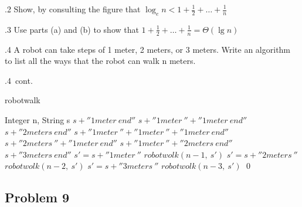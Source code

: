 \documentclass[handout]{beamer}
\begin{document}
        \begin{frame}[c]{\subsecname.2}
            Show, by consulting the figure that $\log_e{n}<1+\frac{1}{2}+\ldots+\frac{1}{n}$
        \end{frame}
    
        \begin{frame}[c]{\subsecname.3}
            Use parts (a) and (b) to show that $1+\frac{1}{2}+\ldots+\frac{1}{n}=\Theta(\lg{n})$
        \end{frame}
    
        \begin{frame}[c]{\subsecname.4}
            A robot can take steps of 1 meter, 2 meters, or 3 meters. Write an algorithm to list all the ways that the robot can walk n meters.
        \end{frame}
        
        \begin{frame}[c,shrink]{\subsecname.4\ cont.}          
            \begin{algorithm}[H]
                \caption {robotwalk}
                \label{alg4}
                \begin{algorithmic}[1]
                    \REQUIRE Integer n, String s
                    \PRINT $s+''1 meter\ end''$
                    \RETURN
                    \PRINT $s+''1 meter\ ''+''1 meter\ end''$
                    \PRINT $s+''2 meters\ end''$
                    \RETURN
                    \PRINT $s+''1 meter\ ''+''1 meter\ ''+''1 meter\ end''$
                    \PRINT $s+''2 meters\ ''+''1 meter\ end''$
                    \PRINT $s+''1 meter\ ''+''2 meters\ end''$
                    \PRINT $s+''3 meters\ end''$
                    \RETURN
                    \ELSE
                    \STATE $s\prime = s + ''1 meter\ ''$
                    \STATE $robotwolk(n-1,\ s\prime)$
                    \STATE $s\prime = s + ''2 meters\ ''$
                    \STATE $robotwolk(n-2,\ s\prime)$
                    \STATE $s\prime = s + ''3 meters\ ''$
                    \STATE $robotwolk(n-3,\ s\prime)$
                    \ENDIF \qed
                \end{algorithmic}
            \end{algorithm}        
        \end{frame}



    \subsection{Problem 9}
    
\end{document}
